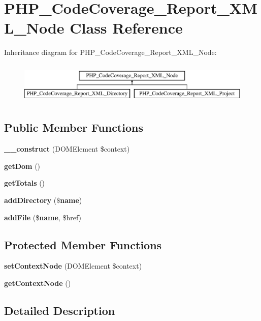 \section{P\+H\+P\+\_\+\+Code\+Coverage\+\_\+\+Report\+\_\+\+X\+M\+L\+\_\+\+Node Class Reference}
\label{class_p_h_p___code_coverage___report___x_m_l___node}
Inheritance diagram for P\+H\+P\+\_\+\+Code\+Coverage\+\_\+\+Report\+\_\+\+X\+M\+L\+\_\+\+Node\+:\begin{figure}[H]
\begin{center}
\leavevmode
\includegraphics[height=2.000000cm]{class_p_h_p___code_coverage___report___x_m_l___node}
\end{center}
\end{figure}
\subsection*{Public Member Functions}
\begin{DoxyCompactItemize}
\item 
{\bf \+\_\+\+\_\+construct} (D\+O\+M\+Element \$context)
\item 
{\bf get\+Dom} ()
\item 
{\bf get\+Totals} ()
\item 
{\bf add\+Directory} (\${\bf name})
\item 
{\bf add\+File} (\${\bf name}, \$href)
\end{DoxyCompactItemize}
\subsection*{Protected Member Functions}
\begin{DoxyCompactItemize}
\item 
{\bf set\+Context\+Node} (D\+O\+M\+Element \$context)
\item 
{\bf get\+Context\+Node} ()
\end{DoxyCompactItemize}


\subsection{Detailed Description}


